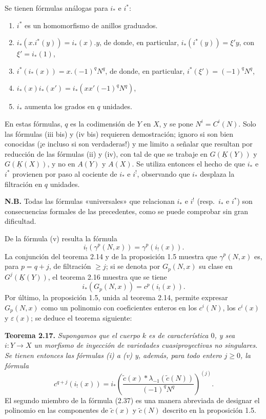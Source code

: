 Se tienen fórmulas análogas para $i_*$ e $i^*$:
\begin{enumerate}[label=(\roman* bis)]
\item $i^*$ es un homomorfismo de anillos graduados.
\item $i_*(x.i^*(y))=i_*(x).y$, de donde, en particular, $i_*(i^*(y))=\xi' y$, con $\xi'=i_*(1)$,
\item $i^*(i_*(x))=x.(-1)^q N^q$, de donde, en particular, $i^*(\xi')=(-1)^q N^q$,
\item $i_*(x)i_*(x')=i_*(xx'(-1)^q N^q)$,
\item $i_*$ aumenta los grados en $q$ unidades.
\end{enumerate}
En estas fórmulas, $q$ es la codimensión de $Y$ en $X$, y se pone $N^i=C^i(N)$. Solo las fórmulas (iii bis) y (iv bis) requieren demostración; ignoro si son bien conocidas (¡e incluso si son verdaderas!) y me limito a señalar que resultan por reducción de las fórmulas (ii) y (iv), con tal de que se trabaje en $G(\underline K(Y))$ y $G(\underline K(X))$, y no en $A(Y)$ y $A(X)$. Se utiliza entonces el hecho de que $i_*$ e $i^*$ provienen por paso al cociente de $i_*$ e $i^!$, observando que $i_*$ desplaza la filtración en $q$ unidades.

\textbf{N.B.} Todas las fórmulas «universales» que relacionan $i_*$ e $i^!$ (resp.\ $i_*$ e $i^*$) son consecuencias formales de las precedentes, como se puede comprobar sin gran dificultad.

De la fórmula (v) resulta la fórmula
\[
 i_!(\gamma^p(N,x))=\gamma^p(i_!(x)).
\]
La conjunción del teorema 2.14 y de la proposición 1.5 muestra que $\gamma^p(N,x)$ es, para $p=q+j$, de filtración $\geq j$; si se denota por $G_p(N,x)$ su clase en $G^j(\underline K(Y))$, el teorema 2.16 muestra que se tiene
\[
 i_*(G_p(N,x))=c^p(i_!(x)).
\]
Por último, la proposición 1.5, unida al teorema 2.14, permite expresar $G_p(N,x)$ como un polinomio con coeficientes enteros en los $c^i(N)$, los $c^i(x)$ y $\varepsilon(x)$; se deduce el teorema siguiente:

\textbf{Teorema 2.17.} \emph{Supongamos que el cuerpo $k$ es de característica $0$, y sea $i:Y\longrightarrow X$ un morfismo de inyección de variedades cuasiproyectivas no singulares. Se tienen entonces las fórmulas (i) a (v) y, además, para todo entero $j\geq0$, la fórmula}
\begin{equation}\tag{2.37}
 c^{q+j}(i_!(x))=i_*\left(\frac{\widetilde c(x)*\lambda_{-1}(\widetilde c(N))}{(-1)^qN^q}\right)^{(j)}.
\end{equation}
El segundo miembro de la fórmula (2.37) es una manera abreviada de designar el polinomio en las componentes de $\widetilde c(x)$ y $\widetilde c(N)$ descrito en la proposición 1.5.


